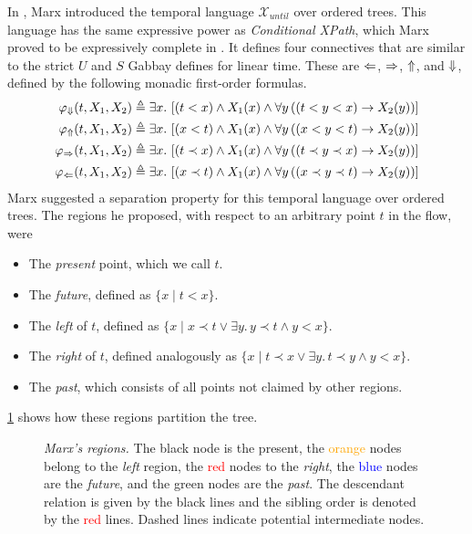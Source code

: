 \documentclass[a4paper,UKenglish,cleveref, autoref, thm-restate, numberwithinsect]{lipics-v2021}
\def\Larrow{\ensuremath\mathord{\Leftarrow}}
\def\Rarrow{\ensuremath\mathord{\Rightarrow}}
\def\Uarrow{\ensuremath\mathord{\Uparrow}}
\def\Darrow{\ensuremath\mathord{\Downarrow}}
\begin{document}
In \cite{xpathComplete}, Marx introduced the temporal language $\mathcal{X}_{until}$ over ordered trees. This language has the same expressive power as \textit{Conditional XPath}, which Marx proved to be expressively complete in \cite{marx2005conditional}. It defines four connectives that are similar to the strict $U$ and $S$ Gabbay defines for linear time. These are $\Larrow$, $\Rarrow$, $\Uarrow$, and $\Darrow$, defined by the following monadic first-order formulas.
\begin{equation*}
    \begin{aligned}
        \varphi_{\Darrow}(t, X_1, X_2) &\triangleq \exists x.\, \left[ \left( t < x \right) \land X_1(x) \land \forall y \left( \left( t < y < x \right) \to X_2(y) \right) \right]\\
        \varphi_{\Uarrow}(t, X_1, X_2) &\triangleq \exists x.\, \left[ \left( x < t \right) \land X_1(x) \land \forall y \left( \left( x < y < t \right) \to X_2(y) \right) \right]\\
        \varphi_{\Rarrow}(t, X_1, X_2) &\triangleq \exists x.\, \left[ \left( t \prec x \right) \land X_1(x) \land \forall y \left( \left( t \prec y \prec x \right) \to X_2(y) \right) \right]\\
        \varphi_{\Larrow}(t, X_1, X_2) &\triangleq \exists x.\, \left[ \left( x \prec t \right) \land X_1(x) \land \forall y \left( \left( x \prec y \prec t \right) \to X_2(y) \right) \right]
    \end{aligned}
\end{equation*}
Marx suggested a separation property for this temporal language over ordered trees. The regions he proposed, with respect to an arbitrary point $t$ in the flow, were
\begin{itemize} %
    \item The \textit{present} point, which we call $t$.
    \item The \textit{future}, defined as $\{x \mid t < x \}$.
    \item The \textit{left} of $t$, defined as $\{x \mid x \prec t \lor \exists y.\, y \prec t \land y < x \}$.
    \item The \textit{right} of $t$, defined analogously as $\{x \mid t \prec x \lor \exists y.\, t \prec y \land y < x \}$.
    \item The \textit{past}, which consists of all points not claimed by other regions.
\end{itemize}
\cref{fig:marx-regions} shows how these regions partition the tree.
\begin{figure}[h]
    \centering
    \caption[]{\emph{Marx's regions.} The black node is the present, the \textcolor{orange}{orange} nodes belong to the \textit{left} region, the \textcolor{red}{red} nodes to the \textit{right}, the \textcolor{blue}{blue} nodes are the \textit{future}, and the \textcolor{OliveGreen}{green} nodes are the \textit{past}. The descendant relation is given by the black lines and the sibling order is denoted by the \textcolor{red}{red} lines. Dashed lines indicate potential intermediate nodes.}
    \label{fig:marx-regions}
\end{figure}
\end{document}
